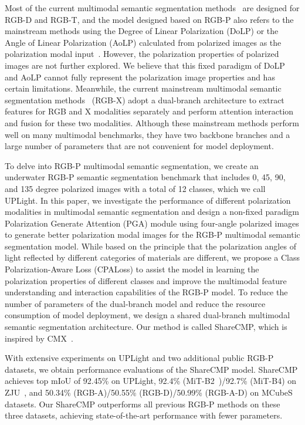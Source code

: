 \documentclass[10pt,twocolumn,letterpaper]{article}
\begin{document}
Most of the current multimodal semantic segmentation methods~\cite{28,29,31,32} are designed for RGB-D and RGB-T, and the model designed based on RGB-P also refers to the mainstream methods using the Degree of Linear Polarization (DoLP) or the Angle of Linear Polarization (AoLP) calculated from polarized images as the polarization modal input~\cite{mcubes,2,zju,4,5}. However, the polarization properties of polarized images are not further explored. We believe that this fixed paradigm of DoLP and AoLP cannot fully represent the polarization image properties and has certain limitations. Meanwhile, the current mainstream multimodal semantic segmentation methods~\cite{cmx,cmnext,32} (RGB-X) adopt a dual-branch architecture to extract features for RGB and X modalities separately and perform attention interaction and fusion for these two modalities. Although these mainstream methods perform well on many multimodal benchmarks, they have two backbone branches and a large number of parameters that are not convenient for model deployment.


To delve into RGB-P multimodal semantic segmentation, we create an underwater RGB-P semantic segmentation benchmark that includes 0, 45, 90, and 135 degree polarized images with a total of 12 classes, which we call UPLight. In this paper, we investigate the performance of different polarization modalities in multimodal semantic segmentation and design a non-fixed paradigm Polarization Generate Attention (PGA) module using four-angle polarized images to generate better polarization modal images for the RGB-P multimodal semantic segmentation model. While based on the principle that the polarization angles of light reflected by different categories of materials are different, we propose a Class Polarization-Aware Loss (CPALoss) to assist the model in learning the polarization properties of different classes and improve the multimodal feature understanding and interaction capabilities of the RGB-P model. To reduce the number of parameters of the dual-branch model and reduce the resource consumption of model deployment, we design a shared dual-branch multimodal semantic segmentation architecture. Our method is called ShareCMP, which is inspired by CMX~\cite{cmx}.


With extensive experiments on UPLight and two additional public RGB-P datasets, we obtain performance evaluations of the ShareCMP model. ShareCMP achieves top mIoU of 92.45\% on UPLight, 92.4\% (MiT-B2~\cite{26})/92.7\% (MiT-B4) on ZJU~\cite{zju}, and 50.34\% (RGB-A)/50.55\% (RGB-D)/50.99\% (RGB-A-D) on MCubeS~\cite{mcubes} datasets. Our ShareCMP outperforms all previous RGB-P methods on these three datasets, achieving state-of-the-art performance with fewer parameters.
\end{document}
